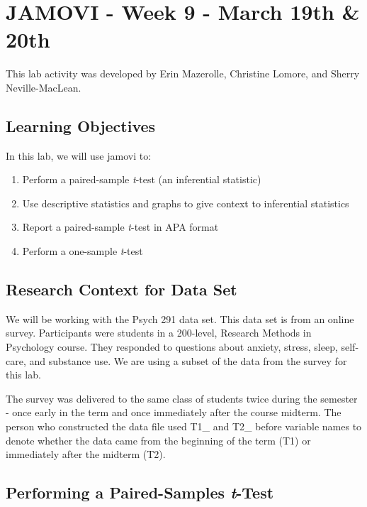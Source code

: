 \documentclass[
]{book}
\providecommand{\tightlist}{%
  \setlength{\itemsep}{0pt}\setlength{\parskip}{0pt}}
\begin{document}
\hypertarget{jamovi---week-9---march-19th-20th}{%
\section{JAMOVI - Week 9 - March 19th \& 20th}\label{jamovi---week-9---march-19th-20th}}

This lab activity was developed by Erin Mazerolle, Christine Lomore, and Sherry Neville-MacLean.

\hypertarget{learning-objectives-1}{%
\subsection{Learning Objectives}\label{learning-objectives-1}}

In this lab, we will use jamovi to:

\begin{enumerate}
\def\labelenumi{\arabic{enumi}.}
\tightlist
\item
  Perform a paired-sample \emph{t}-test (an inferential statistic)
\item
  Use descriptive statistics and graphs to give context to inferential statistics
\item
  Report a paired-sample \emph{t}-test in APA format
\item
  Perform a one-sample \emph{t}-test
\end{enumerate}

\hypertarget{research-context-for-data-set}{%
\subsection{Research Context for Data Set}\label{research-context-for-data-set}}

We will be working with the Psych 291 data set. This data set is from an online survey. Participants were students in a 200-level, Research Methods in Psychology course. They responded to questions about anxiety, stress, sleep, self-care, and substance use. We are using a subset of the data from the survey for this lab.

The survey was delivered to the same class of students twice during the semester - once early in the term and once immediately after the course midterm. The person who constructed the data file used T1\_ and T2\_ before variable names to denote whether the data came from the beginning of the term (T1) or immediately after the midterm (T2).

\hypertarget{performing-a-paired-samples-t-test-1}{%
\subsection{\texorpdfstring{Performing a Paired-Samples \emph{t}-Test}{Performing a Paired-Samples t-Test}}\label{performing-a-paired-samples-t-test-1}}
\end{document}
